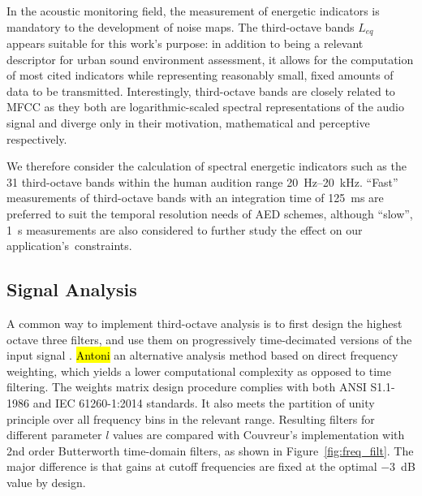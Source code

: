 \documentclass[sensors,article,accept,moreauthors,pdftex,10pt,a4paper]{mdpi}
\DeclareRobustCommand{\fg}[1]{{\sethlcolor{cyan}\hl{#1}}}
\begin{document}
In the acoustic monitoring field, the measurement of energetic indicators is mandatory to the development of noise maps. The third-octave bands $L_{eq}$ appears suitable for this work's purpose: in addition to being a relevant descriptor \cite{torija2013} for urban sound environment assessment, it allows for the computation of most cited indicators while representing reasonably small, fixed amounts of data to be transmitted. Interestingly, third-octave bands are closely related to MFCC as they both are logarithmic-scaled spectral representations of the audio signal and diverge only in their motivation, mathematical and perceptive respectively.

We therefore consider the calculation of spectral energetic indicators such as the 31 third-octave bands within the human audition range 20~Hz--20~kHz. ``Fast'' measurements of third-octave bands with an integration time of 125~ms are preferred to suit the temporal resolution needs of AED schemes, although ``slow'', 1~s measurements are also considered to further study the effect on our \mbox{application's constraints.}

\subsection{Signal Analysis}

A common way to implement third-octave analysis is to first design the highest octave three filters, and use them on progressively time-decimated versions of the input signal \cite{davis1986}. \fg{Antoni} %
 \cite{antoni2010}  an alternative analysis method based on direct frequency weighting, which yields a lower computational complexity as opposed to time filtering. The weights matrix design procedure complies with both ANSI S1.1-1986 \cite{citeulike:9580295} and IEC 61260-1:2014 \cite{iec-norm} standards. It also meets the partition of unity principle over all frequency bins in the relevant range. Resulting filters for different parameter $l$ values are compared with Couvreur's implementation \cite{couvreur} with 2nd order Butterworth time-domain filters, as shown in Figure~\ref{fig:freq_filt}. The major difference is that gains at cutoff frequencies are fixed at the optimal $-3$~dB value by design.
\vspace{-6pt}
\end{document}
